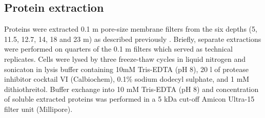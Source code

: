 \subsection{Protein extraction}
Proteins were extracted 0.1 \textmu{}m pore-size membrane filters from the six depths (5, 11.5, 12.7, 14, 18 and 23 m) as described previously \cite{Ng2010a, Ng2010b, Lauro2011}.
Briefly, separate extractions were performed on quarters of the 0.1 \textmu{}m filters which served as technical replicates.
Cells were lysed by three freeze-thaw cycles in liquid nitrogen and sonicaton in lysis buffer containing 10mM Tris-EDTA (pH 8), 20 \textmu{}l of protease inhibitor cocktail VI (Calbiochem), 0.1\% sodium dodecyl sulphate, and 1 mM dithiothreitol.
Buffer exchange into 10 mM Tris-EDTA (pH 8) and concentration of soluble extracted proteins was performed in a 5 kDa cut-off Amicon Ultra-15 filter unit (Millipore).

